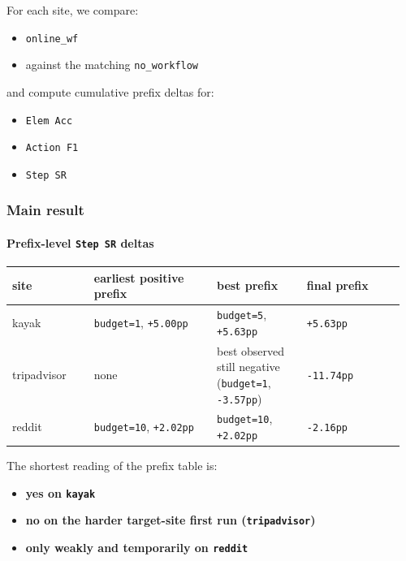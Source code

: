 For each site, we compare:

\begin{itemize}
\tightlist
\item
  \texttt{online\_wf}
\item
  against the matching \texttt{no\_workflow}
\end{itemize}

and compute cumulative prefix deltas for:

\begin{itemize}
\tightlist
\item
  \texttt{Elem\ Acc}
\item
  \texttt{Action\ F1}
\item
  \texttt{Step\ SR}
\end{itemize}

\subsubsection{Main result}

\paragraph{\texorpdfstring{Prefix-level \texttt{Step\ SR}
deltas}{Prefix-level Step SR deltas}}

{\def\LTcaptype{} %
\begin{longtable}[]{@{}>{\raggedright\arraybackslash}p{0.20\linewidth}>{\raggedright\arraybackslash}p{0.30\linewidth}>{\raggedright\arraybackslash}p{0.22\linewidth}>{\raggedright\arraybackslash}p{0.24\linewidth}@{}}
\toprule\noalign{}
site & earliest positive prefix & best prefix & final prefix \\
\midrule\noalign{}
\endhead
\bottomrule\noalign{}
\endlastfoot
kayak & \texttt{budget=1}, \texttt{+5.00pp} & \texttt{budget=5},
\texttt{+5.63pp} & \texttt{+5.63pp} \\
tripadvisor & none & best observed still negative (\texttt{budget=1},
\texttt{-3.57pp}) & \texttt{-11.74pp} \\
reddit & \texttt{budget=10}, \texttt{+2.02pp} & \texttt{budget=10},
\texttt{+2.02pp} & \texttt{-2.16pp} \\
\end{longtable}
}

The shortest reading of the prefix table is:

\begin{itemize}
\tightlist
\item
  \textbf{yes on \texttt{kayak}}
\item
  \textbf{no on the harder target-site first run (\texttt{tripadvisor})}
\item
  \textbf{only weakly and temporarily on \texttt{reddit}}
\end{itemize}

